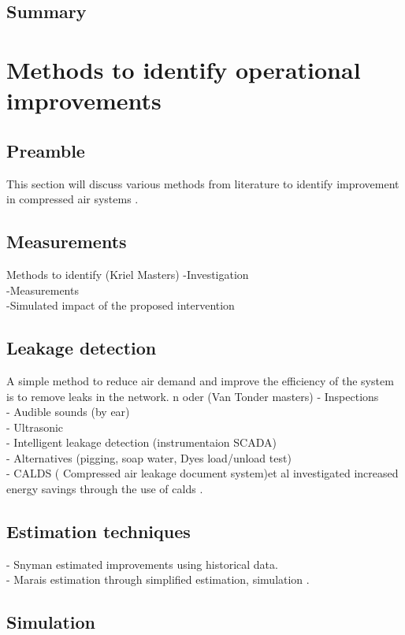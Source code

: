 	\subsection{Summary}
\clearpage
\section{Methods to identify operational improvements}
	\subsection{Preamble}
		This section will discuss various methods from literature to identify improvement in compressed air systems . 
	\subsection{Measurements}	
		Methods to identify 
		(Kriel Masters)
		-Investigation\\
		-Measurements\\
		-Simulated impact of the proposed intervention\\
	\subsection{Leakage detection}
		A simple method to reduce air demand and improve the efficiency of the system is to remove leaks in the network. n oder
		(Van Tonder masters)
		- Inspections\\
		- Audible sounds (by ear)\\
		- Ultrasonic\\
		- Intelligent leakage detection (instrumentaion SCADA)\\
		- Alternatives (pigging, soap water, Dyes load/unload test)\\
		-  CALDS ( Compressed air leakage document system)et al investigated increased energy savings through the use of \gls{calds} \cite{marais2009increased}.	
	\subsection{Estimation techniques}
		- Snyman estimated improvements using historical data.\cite{Snyman2011Masters}\\
		- Marais estimation through simplified estimation, simulation \cite{Marais2012PhD, marais2013simplification}.
	\subsection{Simulation}

